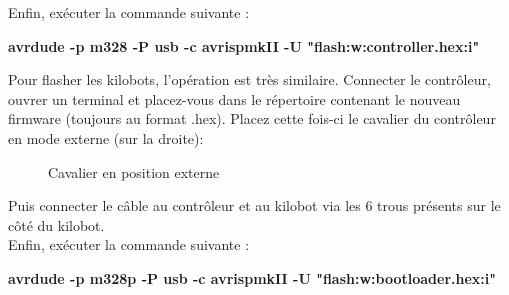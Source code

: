 \documentclass[a4paper,8pt]{report}
\begin{document}
Enfin, ex\'ecuter la commande suivante :\\

\begin{center}
  \textbf{avrdude -p m328  -P usb -c avrispmkII -U "flash:w:controller.hex:i"}
\end{center}

Pour flasher les kilobots, l'op\'eration est tr\`es similaire. Connecter le contr\^oleur, ouvrer un terminal et placez-vous dans le r\'epertoire contenant le nouveau firmware (toujours au format .hex). Placez cette fois-ci le cavalier du contr\^oleur en mode externe (sur la droite): \\

\begin{figure}[!h]
    \centering
    \caption{Cavalier en position externe}
\end{figure}

Puis connecter le c\^able au contr\^oleur et au kilobot via les 6 trous pr\'esents sur le c\^ot\'e du kilobot.\\
Enfin, ex\'ecuter la commande suivante :\\

\begin{center}
  \textbf{avrdude -p m328p -P usb -c avrispmkII -U "flash:w:bootloader.hex:i"}
\end{center}

\smallskip
\begin{center}
\end{center}
\end{document}
